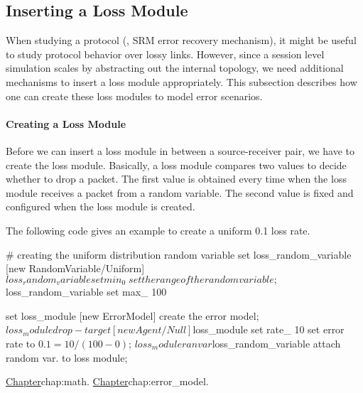 \subsection{Inserting a Loss Module}
\label{sec:loss-config}

When studying a protocol (\eg, SRM error recovery mechanism), 
it might be useful to study protocol behavior over lossy links.
However, since a session level simulation scales by abstracting 
out the internal topology,
we need additional mechanisms to insert a loss module appropriately.
This subsection describes how one can create these loss modules to
model error scenarios.


\paragraph{Creating a Loss Module}
Before we can insert a loss module in between a source-receiver pair,
we have to create the loss module.  Basically,
a loss module compares two values to decide whether to drop a packet.
The first value is obtained every time when the loss module receives 
a packet from a random variable.  The second value
is fixed and configured when the loss module is created.

The following code gives an example to create a uniform 0.1 loss rate.
\begin{program}
        # {\cf creating the uniform distribution random variable}
        set loss_random_variable [new RandomVariable/Uniform] 
        $loss_random_variable set min_ 0 \; set the range of the random variable;
        $loss_random_variable set max_ 100

        set loss_module [new ErrorModel] \; create the error model;
        $loss_module drop-target [new Agent/Null] 
        $loss_module set rate_ 10 \; set error rate to \(0.1 = 10 / (100 - 0)\);
        $loss_module ranvar $loss_random_variable \; attach random var. to loss module;
\end{program}
\href{A catalogue of the random variable distributions was described earlier}{%
        Chapter}{chap:math}.
\href{A more detailed discussion of error models was also described earlier
in a different chapter}{Chapter}{chap:error_model}.

